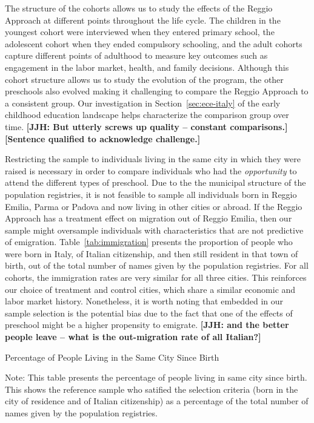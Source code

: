 The structure of the cohorts allows us to study the effects of the Reggio Approach at different points throughout the life cycle. The children in the youngest cohort were interviewed when they entered primary school, the adolescent cohort when they ended compulsory schooling, and the adult cohorts capture different points of adulthood to measure key outcomes such as engagement in the labor market, health, and family decisions. Although this cohort structure allows us to study the evolution of the program, the other preschools also evolved making it challenging to compare the Reggio Approach to a consistent group. Our investigation in Section~\ref{sec:ece-italy} of the early childhood education landscape helps characterize the comparison group over time. \textbf{[JJH: But utterly screws up quality -- constant comparisons.]}\textbf{[Sentence qualified to acknowledge challenge.]}

Restricting the sample to individuals living in the same city in which they were raised is necessary in order to compare individuals who had the \textit{opportunity} to attend the different types of preschool. Due to the the municipal structure of the population registries, it is not feasible to sample all individuals born in Reggio Emilia, Parma or Padova and now living in other cities or abroad. If the Reggio Approach has a treatment effect on migration out of Reggio Emilia, then our sample might oversample individuals with characteristics that are not predictive of emigration. Table~\ref{tab:immigration} presents the proportion of people who were born in Italy, of Italian citizenship, and then still resident in that town of birth, out of the total number of names given by the population registries. For all cohorts, the immigration rates are very similar for all three cities. This reinforces our choice of treatment and control cities, which share a similar economic and labor market history. Nonetheless, it is worth noting that embedded in our sample selection is the potential bias due to the fact that one of the effects of preschool might be a higher propensity to emigrate. \textbf{[JJH: and the better people leave -- what is the out-migration rate of all Italian?]}

\begin{table}[H]
\centering
\begin{threeparttable}
	\caption{Percentage of People Living in the Same City Since Birth}\label{tab:immigration}
	
\begin{tablenotes}
\footnotesize
Note: This table presents the percentage of people living in same city since birth. This  shows the reference sample who satified the selection criteria (born in the city of residence and of Italian citizenship) as a percentage of the total number of names given by the population registries.
\end{tablenotes}
\end{threeparttable}
\end{table}

